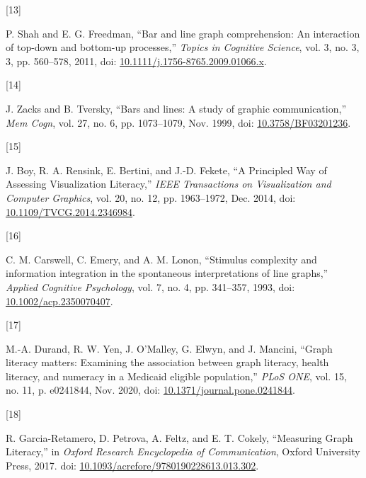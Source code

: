 \documentclass{IEEEcsmag}
\newlength{\cslhangindent}
\newlength{\csllabelwidth}
\newenvironment{CSLReferences}[2] %
 {\begin{list}{}{%
  \setlength{\itemindent}{0pt}
  \setlength{\leftmargin}{0pt}
  \setlength{\parsep}{0pt}
  \ifodd #1
   \setlength{\leftmargin}{\cslhangindent}
   \setlength{\itemindent}{-1\cslhangindent}
  \fi
  \setlength{\itemsep}{#2\baselineskip}}}
 {\end{list}}
\newcommand{\CSLLeftMargin}[1]{\parbox[t]{\csllabelwidth}{#1}}
\newcommand{\CSLRightInline}[1]{\parbox[t]{\linewidth - \csllabelwidth}{#1}\break}
\begin{document}
\begin{CSLReferences}{0}{0}
\CSLLeftMargin{{[}13{]} }%
\CSLRightInline{P. Shah and E. G. Freedman, {``Bar and line graph comprehension: {An} interaction of top-down and bottom-up processes,''} \emph{Topics in Cognitive Science}, vol. 3, no. 3, 3, pp. 560--578, 2011, doi: \href{https://doi.org/10.1111/j.1756-8765.2009.01066.x}{10.1111/j.1756-8765.2009.01066.x}.}

\CSLLeftMargin{{[}14{]} }%
\CSLRightInline{J. Zacks and B. Tversky, {``Bars and lines: {A} study of graphic communication,''} \emph{Mem Cogn}, vol. 27, no. 6, pp. 1073--1079, Nov. 1999, doi: \href{https://doi.org/10.3758/BF03201236}{10.3758/BF03201236}.}

\CSLLeftMargin{{[}15{]} }%
\CSLRightInline{J. Boy, R. A. Rensink, E. Bertini, and J.-D. Fekete, {``A {Principled} {Way} of {Assessing} {Visualization} {Literacy},''} \emph{IEEE Transactions on Visualization and Computer Graphics}, vol. 20, no. 12, pp. 1963--1972, Dec. 2014, doi: \href{https://doi.org/10.1109/TVCG.2014.2346984}{10.1109/TVCG.2014.2346984}.}

\CSLLeftMargin{{[}16{]} }%
\CSLRightInline{C. M. Carswell, C. Emery, and A. M. Lonon, {``Stimulus complexity and information integration in the spontaneous interpretations of line graphs,''} \emph{Applied Cognitive Psychology}, vol. 7, no. 4, pp. 341--357, 1993, doi: \href{https://doi.org/10.1002/acp.2350070407}{10.1002/acp.2350070407}.}

\CSLLeftMargin{{[}17{]} }%
\CSLRightInline{M.-A. Durand, R. W. Yen, J. O'Malley, G. Elwyn, and J. Mancini, {``Graph literacy matters: {Examining} the association between graph literacy, health literacy, and numeracy in a {Medicaid} eligible population,''} \emph{PLoS ONE}, vol. 15, no. 11, p. e0241844, Nov. 2020, doi: \href{https://doi.org/10.1371/journal.pone.0241844}{10.1371/journal.pone.0241844}.}

\CSLLeftMargin{{[}18{]} }%
\CSLRightInline{R. Garcia-Retamero, D. Petrova, A. Feltz, and E. T. Cokely, {``Measuring {Graph Literacy},''} in \emph{Oxford {Research Encyclopedia} of {Communication}}, Oxford University Press, 2017. doi: \href{https://doi.org/10.1093/acrefore/9780190228613.013.302}{10.1093/acrefore/9780190228613.013.302}.}


\end{CSLReferences}
\end{document}
